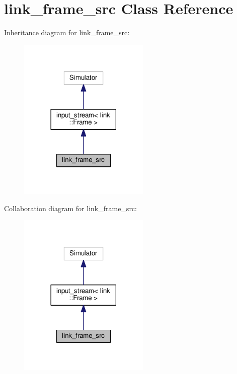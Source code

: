 \hypertarget{classlink__frame__src}{}\section{link\+\_\+frame\+\_\+src Class Reference}
\label{classlink__frame__src}


Inheritance diagram for link\+\_\+frame\+\_\+src\+:\nopagebreak
\begin{figure}[H]
\begin{center}
\leavevmode
\includegraphics[width=177pt]{classlink__frame__src__inherit__graph}
\end{center}
\end{figure}


Collaboration diagram for link\+\_\+frame\+\_\+src\+:\nopagebreak
\begin{figure}[H]
\begin{center}
\leavevmode
\includegraphics[width=177pt]{classlink__frame__src__coll__graph}
\end{center}
\end{figure}
